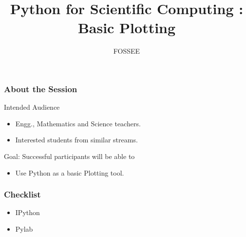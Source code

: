 \documentclass[14pt,compress]{beamer}
\title[Basic Plotting]{Python for Scientific Computing : Basic Plotting}
\author[FOSSEE] {FOSSEE}
\institute[IIT Bombay] {Department of Aerospace Engineering\\IIT Bombay}
\date{}
\begin{document}
\begin{frame}
  \maketitle
\end{frame}

\begin{frame}
  \frametitle{About the Session}
  \begin{block}{Intended Audience}
  \begin{itemize}
       \item Engg., Mathematics and Science teachers.
       \item Interested students from similar streams.
  \end{itemize}
  \end{block}  

  \begin{block}{Goal: Successful participants will be able to}
    \begin{itemize}
      \item Use Python as a basic Plotting tool.
    \end{itemize}
  \end{block}
\end{frame}

\begin{frame}
\frametitle{Checklist}
   \begin{itemize}
    \item IPython
    \item Pylab
  \end{itemize}
\end{frame}

\end{document}
